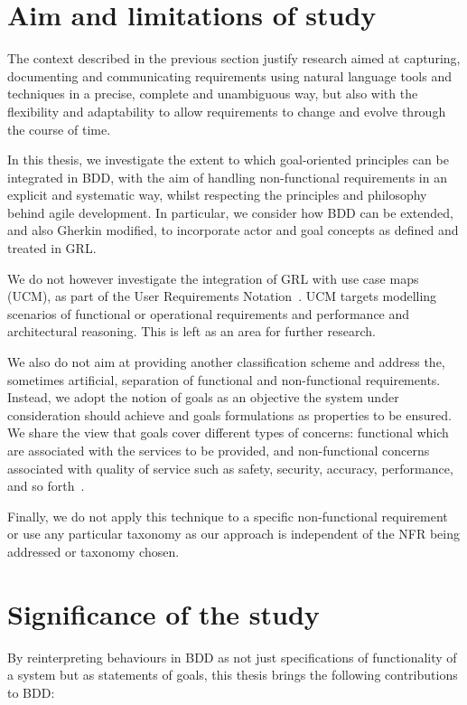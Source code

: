 \documentclass[dissertation,final]{softeng}
\begin{document}
\section{Aim and limitations of study}
The context described in the previous section justify research aimed at capturing, documenting and communicating requirements using natural language tools and techniques in a precise, complete and unambiguous way, but also with the flexibility and adaptability to allow requirements to change and evolve through the course of time.

In this thesis, we investigate the extent to which goal-oriented principles can be integrated in BDD, with the aim of handling non-functional requirements in an explicit and systematic way, whilst respecting the principles and philosophy behind agile development. In particular, we consider how BDD can be extended, and also Gherkin modified, to incorporate actor and goal concepts as defined and treated in GRL.

We do not however investigate the integration of GRL with use case maps (UCM), as part of the User Requirements Notation~\citep{liu2004designing}. UCM targets modelling scenarios of functional or operational requirements and performance and architectural reasoning. This is left as an area for further research.

We also do not aim at providing another classification scheme and address the, sometimes artificial, separation of functional and non-functional requirements. Instead, we adopt the notion of goals as an objective the system under consideration should achieve and goals formulations as properties to be ensured. We share the view that goals cover different types of concerns: functional which are associated with the services to be provided, and non-functional concerns associated with quality of service such as safety, security, accuracy, performance, and so forth~\citep{Lamsweerde:2001wpba}.

Finally, we do not apply this technique to a specific non-functional requirement or use any particular taxonomy as our approach is independent of the NFR being addressed or taxonomy chosen.

\section{Significance of the study}

By reinterpreting behaviours in BDD as not just specifications of functionality of a system but as statements of goals, this thesis brings the following contributions to BDD:
\end{document}
